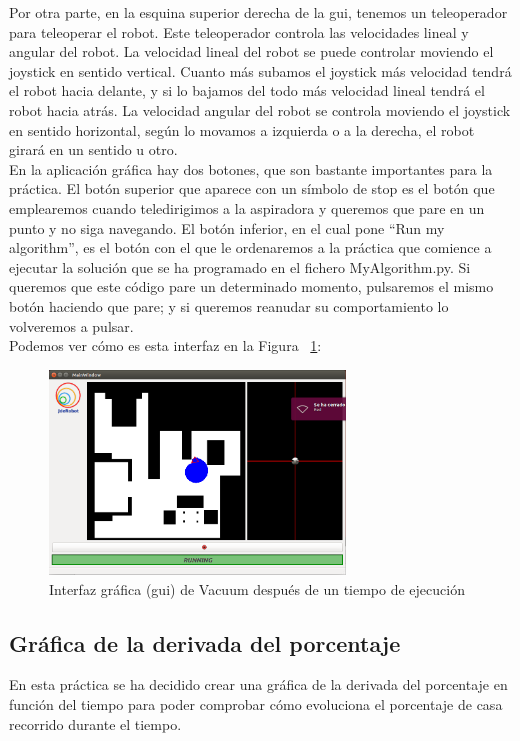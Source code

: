 Por otra parte, en la esquina superior derecha de la \acrshort{gui}, tenemos un teleoperador para teleoperar el robot. Este teleoperador controla las velocidades lineal y angular del robot. La velocidad lineal del robot se puede controlar moviendo el joystick en sentido vertical. Cuanto más subamos el joystick más velocidad tendrá el robot hacia delante, y si lo bajamos del todo más velocidad lineal tendrá el robot hacia atrás. La velocidad angular del robot se controla moviendo el joystick en sentido horizontal, según lo movamos a izquierda o a la derecha, el robot girará en un sentido u otro.\\

En la aplicación gráfica hay dos botones, que son bastante importantes para la práctica. El botón superior que aparece con un símbolo de stop es el botón que emplearemos cuando teledirigimos a la aspiradora y queremos que pare en un punto y no siga navegando. El botón inferior, en el cual pone ``Run my algorithm'', es el botón con el que le ordenaremos a la práctica que comience a ejecutar la solución que se ha programado en el fichero MyAlgorithm.py. Si queremos que este código pare un determinado momento, pulsaremos el mismo botón haciendo que pare; y si queremos reanudar su comportamiento lo volveremos a pulsar.\\

Podemos ver cómo es esta interfaz en la Figura ~\ref{fig.GUI2}:

\begin{figure}[H]
  \begin{center}
    \includegraphics[width=0.7\textwidth]{figures/Vacuum/GUI2.png}
		\caption{Interfaz gráfica (\acrshort{gui}) de Vacuum después de un tiempo de ejecución}
		\label{fig.GUI2}
		\end{center}
\end{figure}

\subsection{Gráfica de la derivada del porcentaje}
En esta práctica se ha decidido crear una gráfica de la derivada del porcentaje en función del tiempo para poder comprobar cómo evoluciona el porcentaje de casa recorrido durante el tiempo.\\

